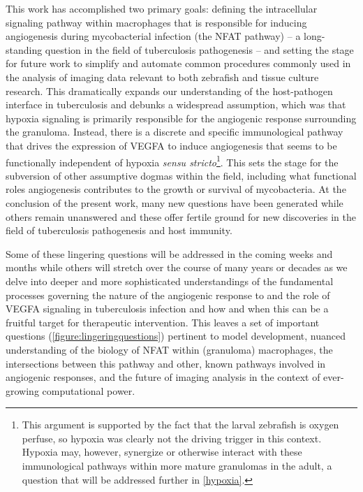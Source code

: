 This work has accomplished two primary goals: defining the intracellular signaling pathway within macrophages that is responsible for inducing angiogenesis during mycobacterial infection (the NFAT pathway) -- a long\hyp{}standing question in the field of tuberculosis pathogenesis -- and setting the stage for future work to simplify and automate common procedures commonly used in the analysis of imaging data relevant to both zebrafish and tissue culture research. This dramatically expands our understanding of the host-pathogen interface in tuberculosis and debunks a widespread assumption, which was that hypoxia signaling is primarily responsible for the angiogenic response surrounding the granuloma. Instead, there is a discrete and specific immunological pathway that drives the expression of VEGFA to induce angiogenesis that seems to be functionally independent of hypoxia \textit{sensu stricto}\footnote{This argument is supported by the fact that the larval zebrafish is oxygen perfuse, so hypoxia was clearly not the driving trigger in this context. Hypoxia may, however, synergize or otherwise interact with these immunological pathways within more mature granulomas in the adult, a question that will be addressed further in \autoref{hypoxia}.}. This sets the stage for the subversion of other assumptive dogmas within the field, including what functional roles angiogenesis contributes to the growth or survival of mycobacteria. At the conclusion of the present work, many new questions have been generated while others remain unanswered and these offer fertile ground for new discoveries in the field of tuberculosis pathogenesis and host immunity. 

Some of these lingering questions will be addressed in the coming weeks and months while others will stretch over the course of many years or decades as we delve into deeper and more sophisticated understandings of the fundamental processes governing the nature of the angiogenic response to and the role of VEGFA signaling in tuberculosis infection and how and when this can be a fruitful target for therapeutic intervention. This leaves a set of important questions (\autoref{figure:lingeringquestions}) pertinent to model development, nuanced understanding of the biology of NFAT within (granuloma) macrophages, the intersections between this pathway and other, known pathways involved in angiogenic responses, and the future of imaging analysis in the context of ever\hyp{}growing computational power. 

